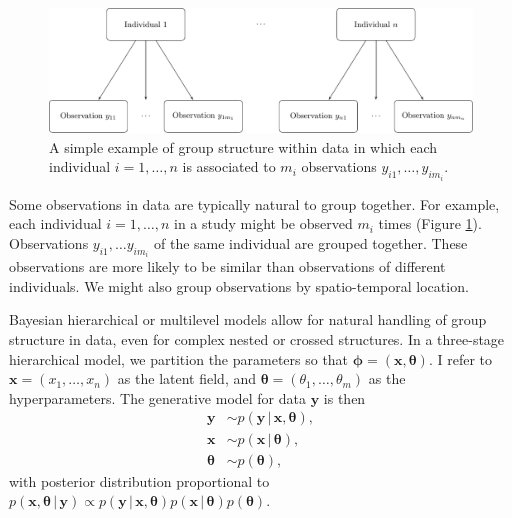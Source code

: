 \documentclass[a4paper, nobind]{templates/ociamthesis}
\begin{document}
\begin{figure}

{\centering \includegraphics[width=0.95\linewidth]{figures/bayesian/hierarchical-structure} 

}

\caption{A simple example of group structure within data in which each individual \(i = 1, \ldots, n\) is associated to \(m_i\) observations \(y_{i1}, \ldots, y_{im_i}\).}\label{fig:hierarchical-structure}
\end{figure}

Some observations in data are typically natural to group together.
For example, each individual \(i = 1, \ldots, n\) in a study might be observed \(m_i\) times (Figure \ref{fig:hierarchical-structure}).
Observations \(y_{i1}, \ldots y_{im_i}\) of the same individual are grouped together.
These observations are more likely to be similar than observations of different individuals.
We might also group observations by spatio-temporal location.

Bayesian hierarchical or multilevel models allow for natural handling of group structure in data, even for complex nested or crossed structures.
In a three-stage hierarchical model, we partition the parameters so that \(\boldsymbol{\mathbf{\phi}} = (\mathbf{x}, \boldsymbol{\mathbf{\theta}})\).
I refer to \(\mathbf{x} = (x_1, \ldots, x_n)\) as the latent field, and \(\boldsymbol{\mathbf{\theta}} = (\theta_1, \ldots, \theta_m)\) as the hyperparameters.
The generative model for data \(\mathbf{y}\) is then
\begin{align}
\mathbf{y} &\sim p(\mathbf{y} \, | \, \mathbf{x}, \boldsymbol{\mathbf{\theta}}), \\
\mathbf{x} &\sim p(\mathbf{x} \, | \, \boldsymbol{\mathbf{\theta}}), \\
\boldsymbol{\mathbf{\theta}} &\sim p(\boldsymbol{\mathbf{\theta}}),
\end{align}
with posterior distribution proportional to \(p(\mathbf{x}, \boldsymbol{\mathbf{\theta}} \, | \, \mathbf{y}) \propto p(\mathbf{y} \, | \, \mathbf{x}, \boldsymbol{\mathbf{\theta}}) p(\mathbf{x} \, | \, \boldsymbol{\mathbf{\theta}}) p(\boldsymbol{\mathbf{\theta}})\).
\end{document}
